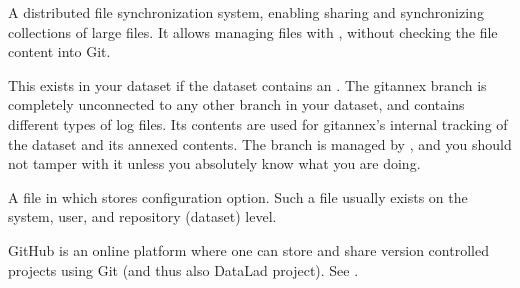 \begin{description}
\sphinxAtStartPar
A distributed file synchronization system, enabling sharing and synchronizing collections
of large files. It allows managing files with {\hyperref[\detokenize{glossary:term-Git}]{}}, without checking the file content into Git.

\ignorespaces 
\sphinxAtStartPar
This {\hyperref[\detokenize{glossary:term-branch}]{}} exists in your dataset if the dataset contains
an {\hyperref[\detokenize{glossary:term-annex}]{}}.  The git\sphinxhyphen{}annex branch is completely unconnected to any
other branch in your dataset, and contains different types of log files.
Its contents are used for git\sphinxhyphen{}annex’s internal tracking of the dataset
and its annexed contents.
The branch is managed by {\hyperref[\detokenize{glossary:term-git-annex}]{}}, and you should not tamper with
it unless you absolutely know what you are doing.

\ignorespaces 
\sphinxAtStartPar
A file in which {\hyperref[\detokenize{glossary:term-Git}]{}} stores configuration option. Such a file usually exists on
the system, user, and repository (dataset) level.

\ignorespaces 
\sphinxAtStartPar
GitHub is an online platform where one can store and share version controlled projects
using Git (and thus also DataLad project). See .


\end{description}
